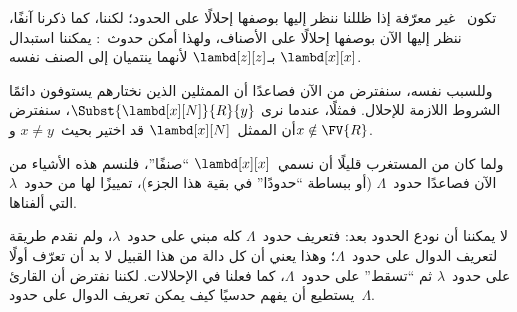 \documentclass[../../../include/open-logic-section]{subfiles}
\begin{document}
تكون~ غير معرّفة إذا ظللنا ننظر إليها بوصفها إحلالًا على
الحدود؛ لكننا، كما ذكرنا آنفًا، ننظر إليها الآن بوصفها إحلالًا على
الأصناف، ولهذا أمكن حدوث~: يمكننا استبدال
$\lambd[x][x]$ بـ$\lambd[z][z]$ لأنهما ينتميان إلى الصنف نفسه.

وللسبب نفسه، سنفترض من الآن فصاعدًا أن الممثلين الذين نختارهم يستوفون
دائمًا الشروط اللازمة للإحلال. فمثلًا، عندما نرى
$\Subst{\lambd[x][N]}{R}{y}$، سنفترض أن الممثل~$\lambd[x][N]$ قد
اختير بحيث~$x \neq y$ و$x \notin \FV{R}$.

ولما كان من المستغرب قليلًا أن نسمي~$\lambd[x][x]$ ``صنفًا''، فلنسم
هذه الأشياء من الآن فصاعدًا حدود~$\Lambda$ (أو ببساطة ``حدودًا'' في
بقية هذا الجزء)، تمييزًا لها من حدود~$\lambda$ التي ألفناها.

\begin{editorial}
  لا يمكننا أن نودع الحدود بعد: فتعريف حدود~$\Lambda$ كله مبني على
  حدود~$\lambda$، ولم نقدم طريقة لتعريف الدوال على حدود~$\Lambda$؛ وهذا
  يعني أن كل دالة من هذا القبيل لا بد أن تعرّف أولًا على حدود~$\lambda$
  ثم ``تسقط'' على حدود~$\Lambda$، كما فعلنا في الإحلالات. لكننا نفترض أن
  القارئ يستطيع أن يفهم حدسيًا كيف يمكن تعريف الدوال على حدود~$\Lambda$.
\end{editorial}
\end{document}
